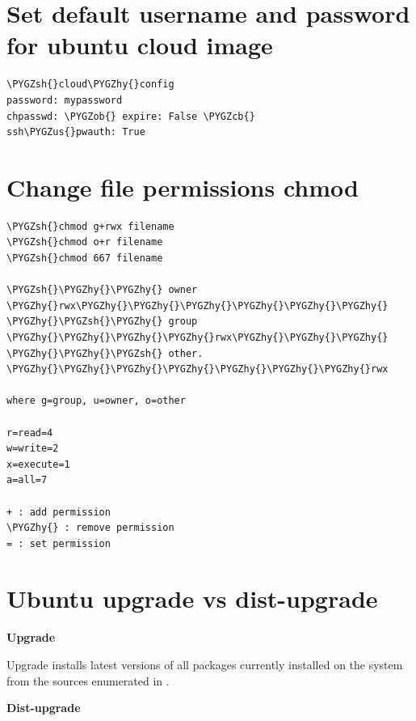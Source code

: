 \documentclass[letterpaper,10pt,english]{sphinxmanual}
\def\PYGZus{\char`\_}
\def\PYGZob{\char`\{}
\def\PYGZcb{\char`\}}
\def\PYGZsh{\char`\#}
\def\PYGZhy{\char`\-}
\begin{document}
\section{Set default username and password for ubuntu cloud image}
\label{_source/installation_guide/post_creation::doc}\label{_source/installation_guide/post_creation:set-default-username-and-password-for-ubuntu-cloud-image}
\begin{Verbatim}[commandchars=\\\{\}]
\PYGZsh{}cloud\PYGZhy{}config
password: mypassword
chpasswd: \PYGZob{} expire: False \PYGZcb{}
ssh\PYGZus{}pwauth: True
\end{Verbatim}


\section{Change file permissions chmod}
\label{_source/installation_guide/file_permissions::doc}\label{_source/installation_guide/file_permissions:change-file-permissions-chmod}
\begin{Verbatim}[commandchars=\\\{\}]
\PYGZsh{}chmod g+rwx filename
\PYGZsh{}chmod o+r filename
\PYGZsh{}chmod 667 filename

\PYGZsh{}\PYGZhy{}\PYGZhy{} owner \PYGZhy{}rwx\PYGZhy{}\PYGZhy{}\PYGZhy{}\PYGZhy{}\PYGZhy{}\PYGZhy{}
\PYGZhy{}\PYGZsh{}\PYGZhy{} group \PYGZhy{}\PYGZhy{}\PYGZhy{}\PYGZhy{}rwx\PYGZhy{}\PYGZhy{}\PYGZhy{}
\PYGZhy{}\PYGZhy{}\PYGZsh{} other. \PYGZhy{}\PYGZhy{}\PYGZhy{}\PYGZhy{}\PYGZhy{}\PYGZhy{}\PYGZhy{}rwx

where g=group, u=owner, o=other

r=read=4
w=write=2
x=execute=1
a=all=7

+ : add permission
\PYGZhy{} : remove permission
= : set permission
\end{Verbatim}


\section{Ubuntu upgrade vs dist-upgrade}
\label{_source/installation_guide/upgrade_vs_dist-upgrade:ubuntu-upgrade-vs-dist-upgrade}\label{_source/installation_guide/upgrade_vs_dist-upgrade::doc}
\textbf{Upgrade}

Upgrade installs latest versions of all packages currently installed on the system from the sources enumerated in .

\textbf{Dist-upgrade}
\end{document}
